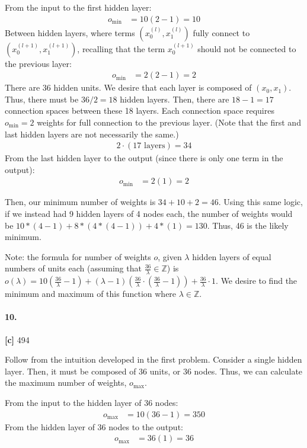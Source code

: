 \documentclass[10pt,letter]{article}
\begin{document}
	From the input to the first hidden layer:
	\begin{align*}
	o_{\text{min}} &= 10(2 - 1) = 10 
	\end{align*}
	Between hidden layers, where terms $(x_0^{(l)}, x_1^{(l)})$ fully connect to $(x_0^{(l+1)}, x_1^{(l+1)})$, recalling that the term $x_0^{(l+1)}$ should not be connected to the previous layer:
	\begin{align*}
	o_{\text{min}} &= 2(2 - 1) = 2
	\end{align*}
	There are 36 hidden units. We desire that each layer is composed of $(x_0, x_1)$. Thus, there must be $36/2 = 18$ hidden layers. Then, there are $18 - 1 = 17$ connection spaces between these 18 layers. Each connection space requires $o_{\text{min}} = 2$ weights for full connection to the previous layer. (Note that the first and last hidden layers are not necessarily the same.)
	\begin{align*}
	2 \cdot (17 \text{ layers}) = 34 
	\end{align*}
	From the last hidden layer to the output (since there is only one term in the output):
	\begin{align*}
	o_{\text{min}} &= 2(1) = 2 
	\end{align*}

	Then, our minimum number of weights is $34 + 10 +2= 46$. Using this same logic, if we instead had 9 hidden layers of 4 nodes each, the number of weights would be $10*(4-1) + 8*(4*(4-1)) + 4*(1) = 130$. Thus, 46 is the likely minimum. 

	Note: the formula for number of weights $o$, given $\lambda$ hidden layers of equal numbers of units each (assuming that $\frac{36}{\lambda} \in \mathbb Z$) is $o(\lambda) = 10(\frac{36}{\lambda} - 1) + (\lambda - 1)(\frac{36}{\lambda}\cdot (\frac{36}{\lambda} - 1)) + \frac{36}{\lambda} \cdot 1$. We desire to find the minimum and maximum of this function where $\lambda \in \mathbb Z$. 

\paragraph{10.} \textbf{[c]} 494
	
	Follow from the intuition developed in the first problem. Consider a single hidden layer. Then, it must be composed of 36 units, or 36 nodes. Thus, we can calculate the maximum number of weights, $o_{\text{max}}$.

	From the input to the hidden layer of 36 nodes:
	\begin{align*}
	o_{\text{max}} &= 10(36 - 1) = 350
	\end{align*}
	From the hidden layer of 36 nodes to the output:
	\begin{align*}
	o_{\text{max}} &= 36(1) = 36
	\end{align*}
\end{document}
